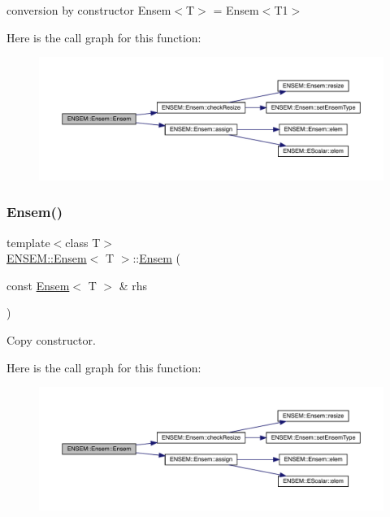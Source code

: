 conversion by constructor Ensem$<$\+T$>$ = Ensem$<$\+T1$>$ 

Here is the call graph for this function\+:
\nopagebreak
\begin{figure}[H]
\begin{center}
\leavevmode
\includegraphics[width=350pt]{d7/d3e/classENSEM_1_1Ensem_ab0e04ebf09af997fb7f1477cdc48145b_cgraph}
\end{center}
\end{figure}
\mbox{\label{classENSEM_1_1Ensem_a5e80cf6ad71f96ba2fa28cac27f06003}} 
\subsubsection{\texorpdfstring{Ensem()}{Ensem()}\hspace{0.1cm}{\footnotesize\ttfamily [9/9]}}
{\footnotesize\ttfamily template$<$class T$>$ \\
\mbox{\hyperlink{classENSEM_1_1Ensem}{E\+N\+S\+E\+M\+::\+Ensem}}$<$ T $>$\+::\mbox{\hyperlink{classENSEM_1_1Ensem}{Ensem}} (\begin{DoxyParamCaption}\item[{const \mbox{\hyperlink{classENSEM_1_1Ensem}{Ensem}}$<$ T $>$ \&}]{rhs }\end{DoxyParamCaption})\hspace{0.3cm}{\ttfamily [inline]}}



Copy constructor. 

Here is the call graph for this function\+:
\nopagebreak
\begin{figure}[H]
\begin{center}
\leavevmode
\includegraphics[width=350pt]{d7/d3e/classENSEM_1_1Ensem_a5e80cf6ad71f96ba2fa28cac27f06003_cgraph}
\end{center}
\end{figure}


